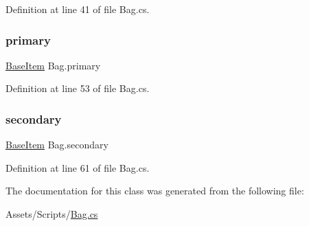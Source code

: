 Definition at line 41 of file Bag.\+cs.

\mbox{\label{class_bag_af0d1113dd35f217846e53dd477071db1}} 
\subsubsection{\texorpdfstring{primary}{primary}}
{\footnotesize\ttfamily \mbox{\hyperlink{class_base_item}{Base\+Item}} Bag.\+primary\hspace{0.3cm}{\ttfamily [get]}}



Definition at line 53 of file Bag.\+cs.

\mbox{\label{class_bag_ad5d314d6b9a11127a8bdebc98f2a9cc0}} 
\subsubsection{\texorpdfstring{secondary}{secondary}}
{\footnotesize\ttfamily \mbox{\hyperlink{class_base_item}{Base\+Item}} Bag.\+secondary\hspace{0.3cm}{\ttfamily [get]}}



Definition at line 61 of file Bag.\+cs.



The documentation for this class was generated from the following file\+:\begin{DoxyCompactItemize}
\item 
Assets/\+Scripts/\mbox{\hyperlink{_bag_8cs}{Bag.\+cs}}\end{DoxyCompactItemize}
